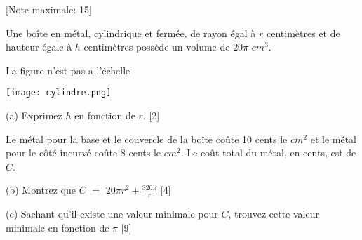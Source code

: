 \begin{question}
  \hspace*{\fill} [Note maximale: 15]\par
  \noindent Une boîte en métal, cylindrique et fermée, de rayon égal à $r$ centimètres et de hauteur égale à $h$ centimètres possède un volume de $20\pi$ $cm^3$.\par
  
  \medskip
  \begin{flushleft}
    \noindent La figure n'est pas a l'échelle\par
    \texttt{[image: cylindre.png]}\par
  \end{flushleft}
  \medskip

  (a) Exprimez $h$ en fonction de $r$.\hspace*{\fill} [2]\par
  \medskip
  \noindent Le métal pour la base et le couvercle de la boîte coûte 10 cents le $cm^2$ et le métal pour le côté incurvé coûte 8 cents le $cm^2$. Le coût total du métal, en cents, est de $C$.\par
  \medskip
  (b) Montrez que $C$ $=$ $20\pi{}r^2 + \frac{320\pi}{r}$\hspace*{\fill} [4]\par
  \medskip

  (c) Sachant qu’il existe une valeur minimale pour $C$, trouvez cette valeur minimale en fonction de $\pi$ \hspace*{\fill} [9]\par
\end{question}


